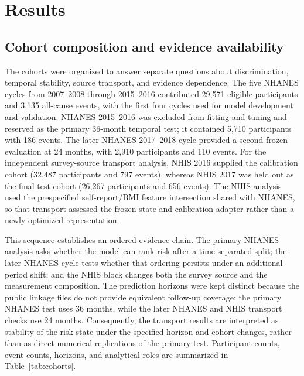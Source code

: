 \documentclass[12pt]{article}
\begin{document}
\section{Results}
\subsection{Cohort composition and evidence availability}
The cohorts were organized to answer separate questions about discrimination, temporal stability, source transport, and evidence dependence. The five NHANES cycles from 2007--2008 through 2015--2016 contributed 29,571 eligible participants and 3,135 all-cause events, with the first four cycles used for model development and validation. NHANES 2015--2016 was excluded from fitting and tuning and reserved as the primary 36-month temporal test; it contained 5,710 participants with 186 events. The later NHANES 2017--2018 cycle provided a second frozen evaluation at 24 months, with 2,910 participants and 110 events. For the independent survey-source transport analysis, NHIS 2016 supplied the calibration cohort (32,487 participants and 797 events), whereas NHIS 2017 was held out as the final test cohort (26,267 participants and 656 events). The NHIS analysis used the prespecified self-report/BMI feature intersection shared with NHANES, so that transport assessed the frozen state and calibration adapter rather than a newly optimized representation.

This sequence establishes an ordered evidence chain. The primary NHANES analysis asks whether the model can rank risk after a time-separated split; the later NHANES cycle tests whether that ordering persists under an additional period shift; and the NHIS block changes both the survey source and the measurement composition. The prediction horizons were kept distinct because the public linkage files do not provide equivalent follow-up coverage: the primary NHANES test uses 36 months, while the later NHANES and NHIS transport checks use 24 months. Consequently, the transport results are interpreted as stability of the risk state under the specified horizon and cohort changes, rather than as direct numerical replications of the primary test. Participant counts, event counts, horizons, and analytical roles are summarized in Table~\ref{tab:cohorts}.
\end{document}
